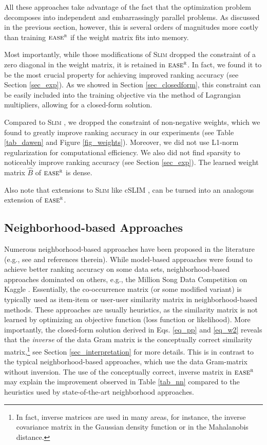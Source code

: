 \documentclass[sigconf]{acmart}
\newcommand{\slim}{{\scshape Slim}}
\newcommand{\sae}{${\textsc{ease}}^{\textsc{r}}$}
\newcommand{\W}{B}
\newcommand{\Wzero}{\hat{\W}  }
\begin{document}
All these approaches take advantage of the fact that the optimization problem decomposes into  independent and embarrassingly parallel  problems. As discussed in the previous section, however,  this is several orders of magnitudes  more costly than training \sae{}  if the weight matrix fits into memory.

Most importantly, while  those modifications of \slim{} dropped the constraint of a zero diagonal in the weight matrix, it is retained  in \sae. In fact, we found it to be the most crucial property for achieving improved ranking accuracy (see Section \ref{sec_exp}). As we showed in Section \ref{sec_closedform}, this constraint can be easily included into the training objective via the method of Lagrangian multipliers, allowing for a closed-form solution.


Compared to  \slim{}  \cite{ning11}, we dropped the constraint of non-negative weights, which we found to greatly improve ranking accuracy in our experiments (see Table \ref{tab_dawen} and Figure \ref{fig_weights}). Moreover, we  did not use L1-norm regularization for computational efficiency. We also did not find sparsity to noticeably improve ranking accuracy (see Section \ref{sec_exp}).  The learned weight matrix $\Wzero$ of \sae{} is dense.

Also note that extensions to \slim{} like cSLIM \cite{ning12}, can be turned into an analogous extension of \sae.

\subsection {Neighborhood-based Approaches}
\label{sec_nn}
Numerous neighborhood-based approaches have been proposed in the literature (e.g., see \cite{koen14, volkovs15} and references therein). While model-based approaches were found to achieve better ranking accuracy on some data sets, neighborhood-based approaches dominated on others, e.g.,  the Million Song Data Competition on Kaggle \cite{mcfee12,aiolli13}. Essentially, the co-occurrence matrix (or some modified variant) is typically used as item-item or user-user similarity matrix in neighborhood-based methods. These approaches are usually heuristics, as the similarity matrix is  not learned by optimizing an objective function (loss function or likelihood). More importantly, the closed-form solution derived in Eqs. \ref{eq_pp} and \ref{eq_w2} reveals that the \emph{inverse} of the data Gram  matrix is the conceptually  correct similarity matrix,\footnote{In fact,  inverse matrices are used in many areas, for instance, the inverse covariance matrix in the Gaussian  density function or in the Mahalanobis distance.} see Section \ref{sec_interpretation} for more details.  This is in contrast to the typical neighborhood-based approaches, which use the data Gram-matrix without inversion.
The use of the conceptually correct, inverse matrix in \sae{}  may explain the improvement observed in Table \ref{tab_nn} compared to the heuristics used by state-of-the-art  neighborhood approaches. 
\end{document}
